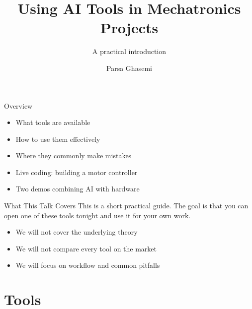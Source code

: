 \documentclass[aspectratio=169,11pt]{beamer}
\title{Using AI Tools in Mechatronics Projects}
\subtitle{A practical introduction}
\date{}
\author{Parsa Ghasemi}
\institute{Autonomous Vehicle Laboratory}
\begin{document}
\maketitle

\begin{frame}{Overview}
  \begin{itemize}
    \setlength\itemsep{0.5em}
    \item What tools are available
    \item How to use them effectively
    \item Where they commonly make mistakes
    \item Live coding: building a motor controller
    \item Two demos combining AI with hardware
  \end{itemize}
\end{frame}

\begin{frame}{What This Talk Covers}
  This is a short practical guide. The goal is that you can open one of these tools tonight and use it for your own work.
  \vfill
  \begin{itemize}
    \setlength\itemsep{0.4em}
    \item We will not cover the underlying theory
    \item We will not compare every tool on the market
    \item We will focus on workflow and common pitfalls
  \end{itemize}
\end{frame}

\section{Tools}
\end{document}
